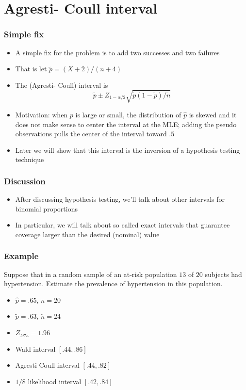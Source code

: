 \documentclass[aspectratio=169]{beamer}
\begin{document}
\section{Agresti- Coull interval}
\begin{frame}\frametitle{Simple fix}
\begin{itemize}
\item A simple fix for the problem is to add two successes and two failures
\item That is let $\tilde p = (X + 2) / (n + 4)$
\item The (Agresti- Coull) interval is 
  $$
  \tilde p \pm Z_{1-\alpha/2} \sqrt{\tilde p (1 - \tilde p) / \tilde n}
  $$
\item Motivation: when $p$ is large or small, the distribution of
  $\hat p$ is skewed and it does not make sense to center the interval
  at the MLE; adding the pseudo observations pulls the center of
  the interval toward $.5$
\item Later we will show that this interval is the inversion of a
  hypothesis testing technique
\end{itemize}
\end{frame}

\begin{frame}\frametitle{Discussion}
\begin{itemize}
\item After discussing hypothesis testing, we'll talk about 
  other intervals for binomial proportions
\item In particular, we will talk about so called exact intervals
  that guarantee coverage larger than the desired (nominal) value
\end{itemize}
\end{frame}

\begin{frame}\frametitle{Example}
Suppose that in a random sample of an at-risk population
$13$ of $20$ subjects had hypertension. Estimate the prevalence
of hypertension in this population.
\begin{itemize}
\item $\hat p = .65$,  $n = 20$
\item $\tilde p = .63$, $\tilde n = 24$
\item $Z_{.975} = 1.96$
\item Wald interval $[.44, .86]$
\item Agresti-Coull interval $[.44, .82]$ 
\item $1/8$ likelihood interval $[.42, .84]$
\end{itemize}
\end{frame}
\end{document}
